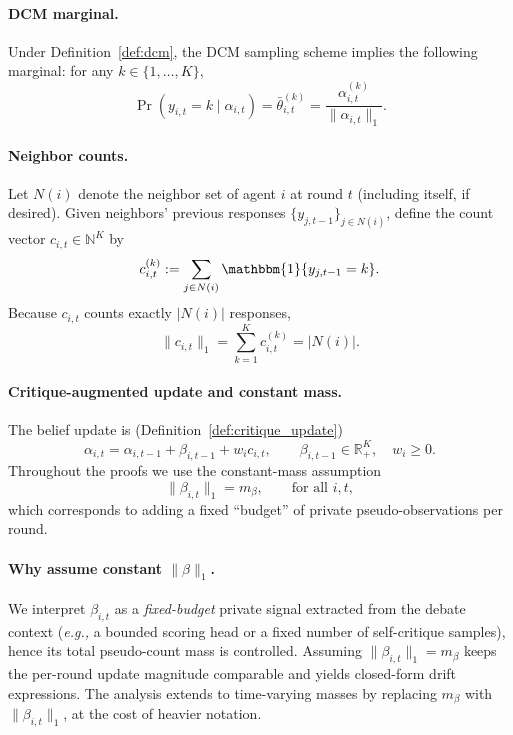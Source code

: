 \paragraph{DCM marginal.}
Under Definition~\ref{def:dcm}, the DCM sampling scheme implies the following marginal:
for any \(k\in\{1,\dots,K\}\),
\begin{equation}
\Pr(y_{i,t}=k\mid \alpha_{i,t})=\bar\theta^{(k)}_{i,t}=\frac{\alpha^{(k)}_{i,t}}{\|\alpha_{i,t}\|_1}.
\label{eq:dcm_marginal_app}
\end{equation}

\paragraph{Neighbor counts.}
Let \(N(i)\) denote the neighbor set of agent \(i\) at round \(t\) (including itself, if desired).
Given neighbors' previous responses \(\{y_{j,t-1}\}_{j\in N(i)}\), define the count vector
\(c_{i,t}\in\mathbb{N}^K\) by
\begin{equation}
c^{(k)}_{i,t}:=\sum_{j\in N(i)}\mathbbm{1}\{y_{j,t-1}=k\}.
\label{eq:count_def_app}
\end{equation}
Because \(c_{i,t}\) counts exactly \(|N(i)|\) responses,
\begin{equation}
\|c_{i,t}\|_1=\sum_{k=1}^K c^{(k)}_{i,t} = |N(i)|.
\label{eq:count_l1_app}
\end{equation}

\paragraph{Critique-augmented update and constant mass.}
The belief update is (Definition~\ref{def:critique_update})
\begin{equation}
\alpha_{i,t}=\alpha_{i,t-1}+\beta_{i,t-1}+w_i c_{i,t},
\qquad \beta_{i,t-1}\in\mathbb{R}^K_+,\quad w_i\ge 0.
\label{eq:update_app}
\end{equation}
Throughout the proofs we use the constant-mass assumption
\begin{equation}
\|\beta_{i,t}\|_1=m_\beta,\qquad \text{for all }i,t,
\label{eq:beta_mass_app}
\end{equation}
which corresponds to adding a fixed ``budget'' of private pseudo-observations per round.

\paragraph{Why assume constant $\|\beta\|_1$.} \label{beta_explained}
We interpret \(\beta_{i,t}\) as a \emph{fixed-budget} private signal extracted from the debate context
(\emph{e.g.,} a bounded scoring head or a fixed number of self-critique samples), hence its total pseudo-count mass is controlled.
Assuming \(\|\beta_{i,t}\|_1=m_\beta\) keeps the per-round update magnitude comparable and yields closed-form drift expressions.
The analysis extends to time-varying masses by replacing \(m_\beta\) with \(\|\beta_{i,t}\|_1\), at the cost of heavier notation.

